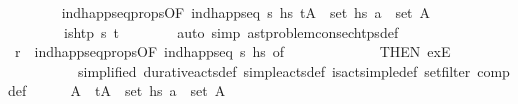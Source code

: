 \begin{isabellebody}
\ \ \ \ \ \ \isamarkupfalse%
\ ind{\isacharunderscore}{\kern0pt}happ{\isacharunderscore}{\kern0pt}seq{\isacharunderscore}{\kern0pt}props{\isacharparenleft}{\kern0pt}{}{\isacharparenright}{\kern0pt}{\isacharbrackleft}{\kern0pt}OF\ {\isacartoucheopen}ind{\isacharunderscore}{\kern0pt}happ{\isacharunderscore}{\kern0pt}seq\ {\isasympi}s\ hs{\isacartoucheclose}\ {\isacartoucheopen}{\isacharparenleft}{\kern0pt}t{\isacharcomma}{\kern0pt}A{\isacharparenright}{\kern0pt}\ {\isasymin}\ set\ hs{\isacartoucheclose}\ {\isacartoucheopen}a\ {\isasymin}\ set\ A{\isacartoucheclose}{\isacharbrackright}{\kern0pt}\isanewline
\ \ \ \ \ \ \ \ {\isacartoucheopen}is{\isacharunderscore}{\kern0pt}htp\ {\isasympi}s\ t{\isacartoucheclose}\isanewline
\ \ \ \ \ \ \isamarkupfalse%
\ {\isacharparenleft}{\kern0pt}auto\ simp{\isacharcolon}{\kern0pt}\ ast{\isacharunderscore}{\kern0pt}problem{\isachardot}{\kern0pt}consec{\isacharunderscore}{\kern0pt}htps{\isacharunderscore}{\kern0pt}def{\isacharparenright}{\kern0pt}\isanewline
\ \ \ \ \isamarkupfalse%
\ r\ {\isacharequal}{\kern0pt}\ ind{\isacharunderscore}{\kern0pt}happ{\isacharunderscore}{\kern0pt}seq{\isacharunderscore}{\kern0pt}props{\isacharparenleft}{\kern0pt}{}{\isacharminus}{\kern0pt}{}{\isacharparenright}{\kern0pt}{\isacharbrackleft}{\kern0pt}OF\ {\isacartoucheopen}ind{\isacharunderscore}{\kern0pt}happ{\isacharunderscore}{\kern0pt}seq\ {\isasympi}s\ hs{\isacharprime}{\kern0pt}{\isacartoucheclose}{\isacharcomma}{\kern0pt}\ of\ {\isacharunderscore}{\kern0pt}\ {\isasympi}{\isacharcomma}{\kern0pt}\ \isanewline
\ \ \ \ \ \ \ \ \ \ THEN\ exE{\isacharcomma}{\kern0pt}\isanewline
\ \ \ \ \ \ \ \ \ \ simplified\ durative{\isacharunderscore}{\kern0pt}acts{\isacharunderscore}{\kern0pt}def\ simple{\isacharunderscore}{\kern0pt}acts{\isacharunderscore}{\kern0pt}def\ is{\isacharunderscore}{\kern0pt}act{\isacharunderscore}{\kern0pt}simple{\isacharunderscore}{\kern0pt}def\ set{\isacharunderscore}{\kern0pt}filter\ comp{\isacharunderscore}{\kern0pt}def{\isacharbrackright}{\kern0pt}\isanewline
\ \ \ \ \isamarkupfalse%
\ A{\isacharprime}{\kern0pt}{\isacharprime}{\kern0pt}\ \ {\isachardoublequoteopen}{\isacharparenleft}{\kern0pt}t{\isacharcomma}{\kern0pt}A{\isacharprime}{\kern0pt}{\isacharprime}{\kern0pt}{\isacharparenright}{\kern0pt}\ {\isasymin}\ set\ hs{\isacharprime}{\kern0pt}{\isachardoublequoteclose}\ {\isachardoublequoteopen}a\ {\isasymin}\ set\ A{\isacharprime}{\kern0pt}{\isacharprime}{\kern0pt}{\isachardoublequoteclose}\isanewline

\end{isabellebody}
